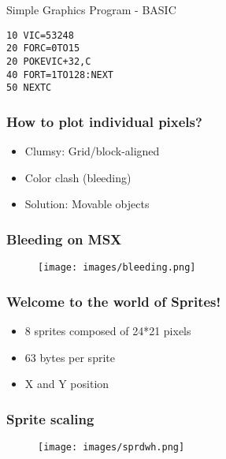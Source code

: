 
\begin{frame}[fragile]{Simple Graphics Program - BASIC}

\begin{lstlisting}
10 VIC=53248
20 FORC=0TO15
20 POKEVIC+32,C
40 FORT=1TO128:NEXT
50 NEXTC
\end{lstlisting}

\end{frame}


\begin{frame}
\frametitle{How to plot individual pixels?}

\begin{itemize}
\item Clumsy: Grid/block-aligned
\item Color clash (bleeding)
\item Solution: Movable objects
\end{itemize}

\end{frame}


\begin{frame}
\frametitle{Bleeding on MSX}

\begin{figure}
\texttt{[image: images/bleeding.png]}
\end{figure}

\end{frame}


\begin{frame}
\frametitle{Welcome to the world of Sprites!}

\begin{itemize}
\item 8 sprites composed of 24*21 pixels
\item 63 bytes per sprite
\item X and Y position
\end{itemize}

\end{frame}


\begin{frame}
\frametitle{Sprite scaling}

\begin{figure}
\texttt{[image: images/sprdwh.png]}
\end{figure}

\end{frame}
